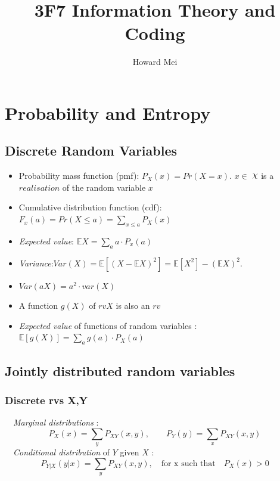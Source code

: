 \documentclass[12pt]{article}
\title{3F7 Information Theory and Coding}
\author{Howard Mei}
\DeclareRobustCommand{\rchi}{{\mathpalette\irchi\relax}}
\newcommand{\irchi}[2]{\raisebox{\depth}{$#1\chi$}} %
\begin{document}
  \maketitle
\section{Probability and Entropy}

\subsection{Discrete Random Variables}
\begin{itemize}

\item Probability mass function (pmf): $P_X(x)=Pr(X=x)$. $x \in$ $\rchi $ is a $realisation$ of the random variable $x$

\item Cumulative distribution function (cdf): $F_x(a)= Pr(X \le a) = \sum_{x\le a} P_X(x)$

\item \textit{Expected value}: $\mathbb{E}X = \sum_a a\cdot P_x(a)$

\item \textit{Variance}:$Var(X) = \mathbb{E}[(X - \mathbb{E}X)^2] = \mathbb{E}[X^2] - (\mathbb{E}X)^2.$

\item $Var(aX) = a^2 \cdot var(X)$

\item A function $g(X)$ of $rv X$ is also an $rv$

\item \textit{Expected value} of functions of random variables : $\mathbb{E}[g(X)] = \sum_a g(a)\cdot P_X(a)$

\end{itemize}

\subsection{Jointly distributed random variables}
\subsubsection{Discrete rvs X,Y}
\quad \ \, \textit{Marginal distributions} :
$$ P_X(x) = \sum_y P_{XY}(x,y), \qquad  P_Y(y) = \sum_x P_{XY}(x,y) $$ 
\quad \ \, \textit{Conditional distribution} of $Y$ given $X$ :
$$ P_{Y|X}(y|x) = \sum_y P_{XY}(x,y), \quad  \textrm{for x such that} \quad P_X(x) > 0$$ 
\end{document}
